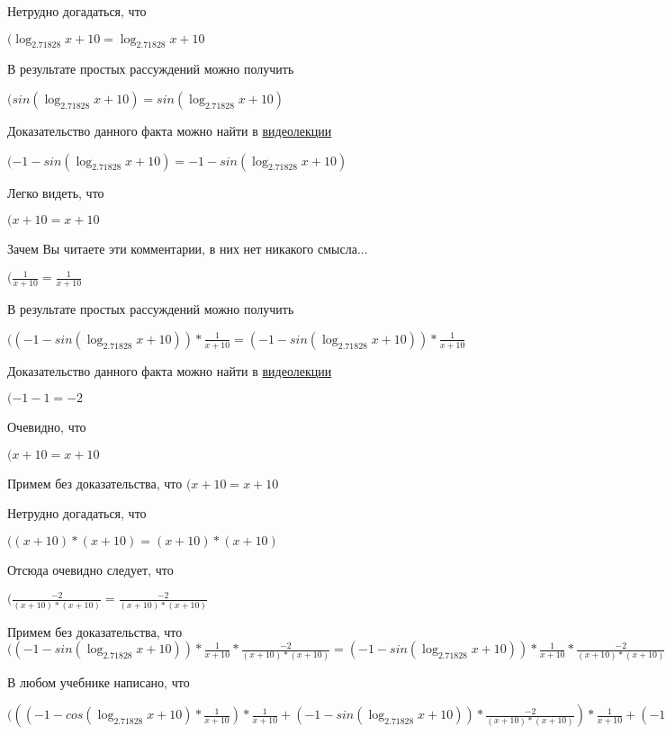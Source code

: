 \documentclass[12pt,a4paper,fleqn]{article}
\theoremstyle{definition}
\begin{document}
Нетрудно догадаться, что

$(\log_{ 2.71828 }{ x  +  10 } = \log_{ 2.71828 }{ x  +  10 }$

В результате простых рассуждений можно получить

$(sin(\log_{ 2.71828 }{ x  +  10 }) = sin(\log_{ 2.71828 }{ x  +  10 })$

Доказательство данного факта можно найти в \href{https://www.youtube.com/watch?v=dQw4w9WgXcQ}{видеолекции}

$( -1  - sin(\log_{ 2.71828 }{ x  +  10 }) =  -1  - sin(\log_{ 2.71828 }{ x  +  10 })$

Легко видеть, что

$( x  +  10  =  x  +  10 $

Зачем Вы читаете эти комментарии, в них нет никакого смысла...

$(\frac{ 1 }{ x  +  10 }
 = \frac{ 1 }{ x  +  10 }
$

В результате простых рассуждений можно получить

$(( -1  - sin(\log_{ 2.71828 }{ x  +  10 })) * \frac{ 1 }{ x  +  10 }
 = ( -1  - sin(\log_{ 2.71828 }{ x  +  10 })) * \frac{ 1 }{ x  +  10 }
$

Доказательство данного факта можно найти в \href{https://www.youtube.com/watch?v=dQw4w9WgXcQ}{видеолекции}

$( -1  -  1  =  -2 $

Очевидно, что

$( x  +  10  =  x  +  10 $

Примем без доказательства, что
$( x  +  10  =  x  +  10 $

Нетрудно догадаться, что

$(( x  +  10 ) * ( x  +  10 ) = ( x  +  10 ) * ( x  +  10 )$

Отсюда очевидно следует, что

$(\frac{ -2 }{( x  +  10 ) * ( x  +  10 )}
 = \frac{ -2 }{( x  +  10 ) * ( x  +  10 )}
$

Примем без доказательства, что
$(( -1  - sin(\log_{ 2.71828 }{ x  +  10 })) * \frac{ 1 }{ x  +  10 }
 * \frac{ -2 }{( x  +  10 ) * ( x  +  10 )}
 = ( -1  - sin(\log_{ 2.71828 }{ x  +  10 })) * \frac{ 1 }{ x  +  10 }
 * \frac{ -2 }{( x  +  10 ) * ( x  +  10 )}
$

В любом учебнике написано, что

$((( -1  - cos(\log_{ 2.71828 }{ x  +  10 }) * \frac{ 1 }{ x  +  10 }
) * \frac{ 1 }{ x  +  10 }
 + ( -1  - sin(\log_{ 2.71828 }{ x  +  10 })) * \frac{ -2 }{( x  +  10 ) * ( x  +  10 )}
) * \frac{ 1 }{ x  +  10 }
 + ( -1  - sin(\log_{ 2.71828 }{ x  +  10 })) * \frac{ 1 }{ x  +  10 }
 * \frac{ -2 }{( x  +  10 ) * ( x  +  10 )}
 = (( -1  - cos(\log_{ 2.71828 }{ x  +  10 }) * \frac{ 1 }{ x  +  10 }
) * \frac{ 1 }{ x  +  10 }
 + ( -1  - sin(\log_{ 2.71828 }{ x  +  10 })) * \frac{ -2 }{( x  +  10 ) * ( x  +  10 )}
) * \frac{ 1 }{ x  +  10 }
 + ( -1  - sin(\log_{ 2.71828 }{ x  +  10 })) * \frac{ 1 }{ x  +  10 }
 * \frac{ -2 }{( x  +  10 ) * ( x  +  10 )}
$
\end{document}
